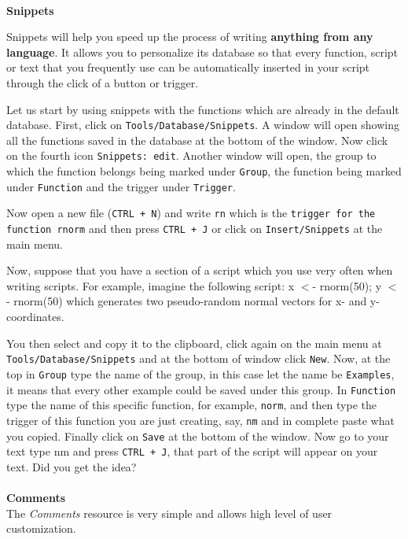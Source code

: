 \paragraph{}\textbf{Snippets}\\

Snippets will help you speed up the process of writing \textbf{anything from any language}.
It allows you to personalize its database so that every function, script or text that you
frequently use can be automatically inserted in your script through the click of a button or trigger.


Let us start by using snippets with the functions which are already in the default database.
First, click on \texttt{Tools/Database/Snippets}. A window will open showing all the functions saved in the
database at the bottom of the window. Now click on the fourth icon \texttt{Snippets: edit}.
Another window will open, the group to which the function belongs being marked under \texttt{Group},
the function being marked under \texttt{Function} and the trigger under \texttt{Trigger}.

Now open a new file (\texttt{CTRL + N}) and write \texttt{rn} which is the \texttt{trigger for the function rnorm}
and then press \texttt{CTRL + J} or click on \texttt{Insert/Snippets} at the main menu.

Now, suppose that you have a section of a script which you use very often when writing scripts.
For example, imagine the following script: x $<$- rnorm(50); y $<$- rnorm(50) which generates
two pseudo-random normal vectors for x- and y-coordinates.

You then select and copy it to the clipboard, click again on the main menu at
\texttt{Tools/Database/Snippets} and at the bottom of window click \texttt{New}.
Now, at the top in \texttt{Group} type the name of the group, in this case let the name be \texttt{Examples},
it means that every other example could be saved under this group. In \texttt{Function} type the name of this
specific function, for example, \texttt{norm}, and then type the trigger of this function you are just creating,
say, \texttt{nm} and in complete paste what you copied. Finally click on \texttt{Save} at the bottom of the window.
Now go to your text type nm and press \texttt{CTRL + J},
that part of the script will appear on your text. Did you get the idea?

\paragraph{}\textbf{Comments}\\
The \textit{Comments} resource is very simple and allows high level
of user customization.


